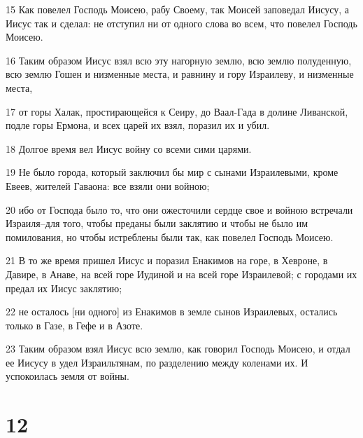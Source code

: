 \par 15 Как повелел Господь Моисею, рабу Своему, так Моисей заповедал Иисусу, а Иисус так и сделал: не отступил ни от одного слова во всем, что повелел Господь Моисею.
\par 16 Таким образом Иисус взял всю эту нагорную землю, всю землю полуденную, всю землю Гошен и низменные места, и равнину и гору Израилеву, и низменные места,
\par 17 от горы Халак, простирающейся к Сеиру, до Ваал-Гада в долине Ливанской, подле горы Ермона, и всех царей их взял, поразил их и убил.
\par 18 Долгое время вел Иисус войну со всеми сими царями.
\par 19 Не было города, который заключил бы мир с сынами Израилевыми, кроме Евеев, жителей Гаваона: все взяли они войною;
\par 20 ибо от Господа было то, что они ожесточили сердце свое и войною встречали Израиля--для того, чтобы преданы были заклятию и чтобы не было им помилования, но чтобы истреблены были так, как повелел Господь Моисею.
\par 21 В то же время пришел Иисус и поразил Енакимов на горе, в Хевроне, в Давире, в Анаве, на всей горе Иудиной и на всей горе Израилевой; с городами их предал их Иисус заклятию;
\par 22 не осталось [ни одного] из Енакимов в земле сынов Израилевых, остались только в Газе, в Гефе и в Азоте.
\par 23 Таким образом взял Иисус всю землю, как говорил Господь Моисею, и отдал ее Иисусу в удел Израильтянам, по разделению между коленами их. И успокоилась земля от войны.

\chapter{12}

